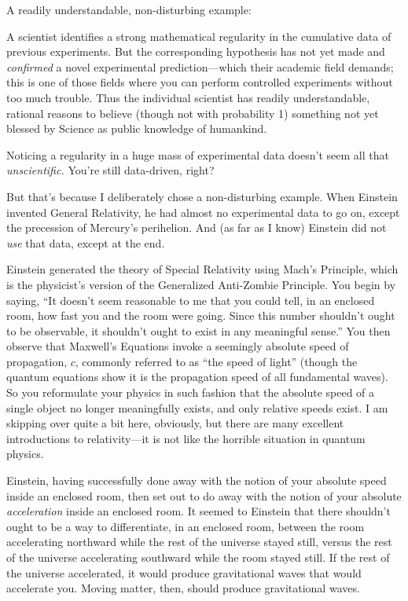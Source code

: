 {
 A readily understandable, non-disturbing example:}

{
 A scientist identifies a strong mathematical regularity in the
cumulative data of previous experiments. But the corresponding
hypothesis has not yet made and \textit{confirmed} a novel experimental
prediction---which their academic field demands; this is one of those
fields where you can perform controlled experiments without too much
trouble. Thus the individual scientist has readily understandable,
rational reasons to believe (though not with probability 1) something
not yet blessed by Science as public knowledge of humankind.}

{
 Noticing a regularity in a huge mass of experimental data
doesn't seem all that \textit{unscientific.}
You're still data-driven, right?}

{
 But that's because I deliberately chose a
non-disturbing example. When Einstein invented General Relativity, he
had almost no experimental data to go on, except the precession of
Mercury's perihelion. And (as far as I know) Einstein
did not \textit{use} that data, except at the end.}

{
 Einstein generated the theory of Special Relativity using
Mach's Principle, which is the
physicist's version of the Generalized Anti-Zombie
Principle. You begin by saying, ``It
doesn't seem reasonable to me that you could tell, in
an enclosed room, how fast you and the room were going. Since this
number shouldn't ought to be observable, it
shouldn't ought to exist in any meaningful
sense.'' You then observe that
Maxwell's Equations invoke a seemingly absolute speed
of propagation, $c$, commonly referred to as ``the speed
of light'' (though the quantum equations show it is
the propagation speed of all fundamental waves). So you reformulate
your physics in such fashion that the absolute speed of a single object
no longer meaningfully exists, and only relative speeds exist. I am
skipping over quite a bit here, obviously, but there are many excellent
introductions to relativity---it is not like the horrible situation in
quantum physics.}

{
 Einstein, having successfully done away with the notion of your
absolute speed inside an enclosed room, then set out to do away with
the notion of your absolute \textit{acceleration} inside an enclosed
room. It seemed to Einstein that there shouldn't ought
to be a way to differentiate, in an enclosed room, between the room
accelerating northward while the rest of the universe stayed still,
versus the rest of the universe accelerating southward while the room
stayed still. If the rest of the universe accelerated, it would produce
gravitational waves that would accelerate you. Moving matter, then,
should produce gravitational waves.}

